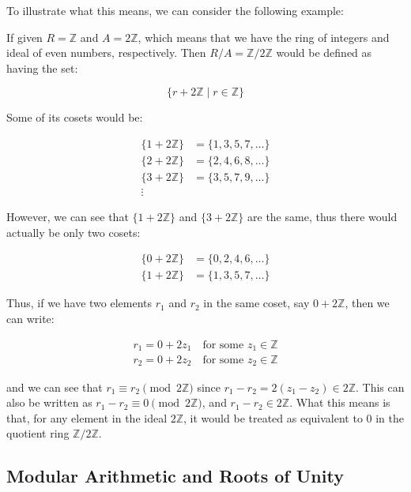 \documentclass[12pt]{article}
\begin{document}
To illustrate what this means, 
we can consider the following example:

If given $R = \mathbb{Z}$ and $A = 2\mathbb{Z}$, 
which means that we have the ring of integers and ideal of even numbers, respectively.
Then $R/A = \mathbb{Z}/2\mathbb{Z}$ would be defined as having the set:

\begin{equation*}
    \{r + 2\mathbb{Z} \mid r \in \mathbb{Z}\}
\end{equation*}

Some of its cosets would be:

\begin{align*}
    \{1 + 2\mathbb{Z}\} &= \{1, 3, 5, 7, \ldots\} \\
    \{2 + 2\mathbb{Z}\} &= \{2, 4, 6, 8, \ldots\} \\
    \{3 + 2\mathbb{Z}\} &= \{3, 5, 7, 9, \ldots\} \\
    \vdots
\end{align*}

However, we can see that $\{1 + 2\mathbb{Z}\}$ and $\{3 + 2\mathbb{Z}\}$ are the same, 
thus there would actually be only two cosets:

\begin{align*}
    \{0 + 2\mathbb{Z}\} &= \{0, 2, 4, 6, \ldots\} \\
    \{1 + 2\mathbb{Z}\} &= \{1, 3, 5, 7, \ldots\} 
\end{align*}

Thus, if we have two elements $r_1$ and $r_2$ in the same coset, say $0 + 2\mathbb{Z}$, 
then we can write:

\begin{align*}
    r_1 = 0 + 2 z_1 \quad \text{for some } z_1 \in \mathbb{Z} \\
    r_2 = 0 + 2 z_2 \quad \text{for some } z_2 \in \mathbb{Z}
\end{align*}

and we can see that $r_1 \equiv r_2 \pmod{2\mathbb{Z}}$ since $r_1 - r_2 = 2(z_1 - z_2) \in 2\mathbb{Z}$.
This can also be written as $r_1 - r_2 \equiv 0 \pmod{2\mathbb{Z}}$, and $r_1 - r_2 \in 2\mathbb{Z}$. 
What this means is that, for any element in the ideal $2\mathbb{Z}$, 
it would be treated as equivalent to $0$ in the quotient ring $\mathbb{Z}/2\mathbb{Z}$.

\subsection{Modular Arithmetic and Roots of Unity}
\end{document}
